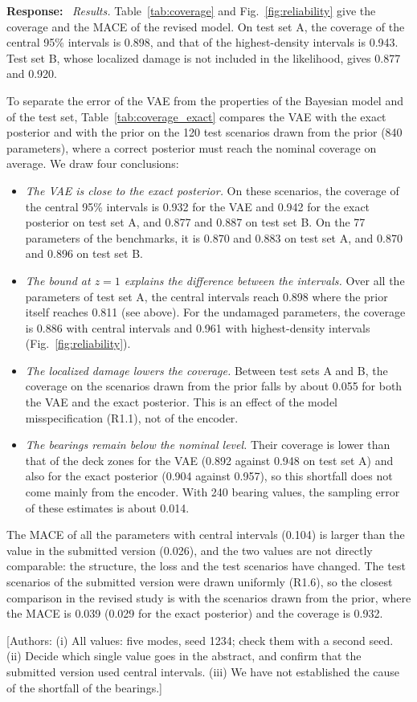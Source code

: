 \documentclass[11pt]{article}
\newenvironment{response}{\par\smallskip\noindent\color{resp}\textbf{Response:}\ }{\par}
\newcommand{\authornote}[1]{\textcolor{note}{\textsf{[Authors: #1]}}}
\begin{document}
\begin{response}
\textit{Results.} Table~\ref{tab:coverage} and Fig.~\ref{fig:reliability} give the coverage and the MACE of the revised
model. On test set A, the coverage of the central 95\% intervals is 0.898, and that of the highest-density intervals is
0.943. Test set B, whose localized damage is not included in the likelihood, gives 0.877 and 0.920.

To separate the error of the VAE from the properties of the Bayesian model and of the test set, Table~\ref{tab:coverage_exact}
compares the VAE with the exact posterior and with the prior on the 120 test scenarios drawn from the prior (840 parameters),
where a correct posterior must reach the nominal coverage on average. We draw four conclusions:
\begin{itemize}[leftmargin=*]
\item \emph{The VAE is close to the exact posterior.} On these scenarios, the coverage of the central 95\% intervals is 0.932
for the VAE and 0.942 for the exact posterior on test set A, and 0.877 and 0.887 on test set B. On the 77 parameters of the
benchmarks, it is 0.870 and 0.883 on test set A, and 0.870 and 0.896 on test set B.
\item \emph{The bound at $z=1$ explains the difference between the intervals.} Over all the parameters of test set A, the
central intervals reach 0.898 where the prior itself reaches 0.811 (see above). For the undamaged parameters, the coverage is
0.886 with central intervals and 0.961 with highest-density intervals (Fig.~\ref{fig:reliability}).
\item \emph{The localized damage lowers the coverage.} Between test sets A and B, the coverage on the scenarios drawn from the
prior falls by about 0.055 for both the VAE and the exact posterior. This is an effect of the model misspecification (R1.1),
not of the encoder.
\item \emph{The bearings remain below the nominal level.} Their coverage is lower than that of the deck zones for the VAE (0.892
against 0.948 on test set A) and also for the exact posterior (0.904 against 0.957), so this shortfall does not come mainly
from the encoder. With 240 bearing values, the sampling error of these estimates is about 0.014.
\end{itemize}

The MACE of all the parameters with central intervals (0.104) is larger than the value in the submitted version (0.026), and the
two values are not directly comparable: the structure, the loss and the test scenarios have changed. The test
scenarios of the submitted version were drawn uniformly (R1.6), so the closest comparison in the revised study is with the
scenarios drawn from the prior, where the MACE is 0.039 (0.029 for the exact posterior) and the coverage is 0.932.
\end{response}
\authornote{(i) All values: five modes, seed 1234; check them with a second seed. (ii) Decide which single value goes in the
abstract, and confirm that the submitted version used central intervals. (iii) We have not
established the cause of the shortfall of the bearings.}
\end{document}
